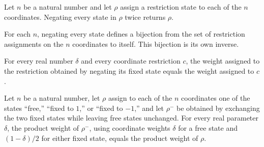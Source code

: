 \begin{theorem}
\label{FABL.CoordRestriction.negateAssignment_involutive}
\leanok
{}
Let $n$ be a natural number and let $\rho$ assign a restriction state to each of the $n$
coordinates. Negating every state in $\rho$ twice returns $\rho$.
\end{theorem}

\begin{definition}
\label{FABL.coordRestrictionNegationEquiv}
\leanok
{}
For each $n$, negating every state defines a bijection from the set of restriction
assignments on the $n$ coordinates to itself. This bijection is its own inverse.
\end{definition}

\begin{theorem}
\label{FABL.coordRestrictionWeightAt_negateState}
\leanok
{}
For every real number $\delta$ and every coordinate restriction $c$, the weight assigned
to the restriction obtained by negating its fixed state equals the weight assigned to
$c$.
\end{theorem}

\begin{theorem}
\label{FABL.restrictionAssignmentWeightAt_negateAssignment}
\leanok
{}
Let $n$ be a natural number, let $\rho$ assign to each of the $n$ coordinates one of the
states “free,” “fixed to $1$,” or “fixed to $-1$,” and let $\rho^{-}$ be obtained by
exchanging the two fixed states while leaving free states unchanged. For every real
parameter $\delta$, the product weight of $\rho^{-}$, using coordinate weights $\delta$ for a
free state and $(1-\delta)/2$ for either fixed state, equals the product weight of $\rho$.
\end{theorem}

